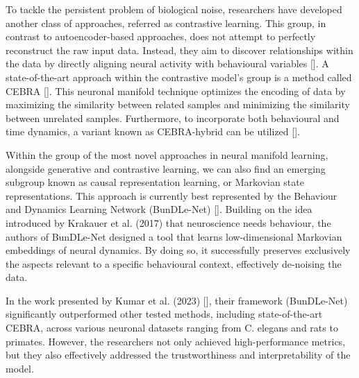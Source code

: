 \documentclass{article}
\begin{document}
To tackle the persistent problem of biological noise, researchers have developed another class of approaches, referred as contrastive learning. This group, in contrast to autoencoder-based approaches, does not attempt to perfectly reconstruct the raw input data. Instead, they aim to discover relationships within the data by directly aligning neural activity with behavioural variables [\cite{mathis2026joint}]. A state-of-the-art approach within the contrastive model’s group is a method called CEBRA [\cite{keshtkaran2022large}]. This neuronal manifold technique optimizes the encoding of data by maximizing the similarity between related samples and minimizing the similarity between unrelated samples. Furthermore, to incorporate both behavioural and time dynamics, a variant known as CEBRA-hybrid can be utilized [\cite{schneider2025time}].

Within the group of the most novel approaches in neural manifold learning, alongside generative and contrastive learning, we can also find an emerging subgroup known as causal representation learning, or Markovian state representations. This approach is currently best represented by the Behaviour and Dynamics Learning Network (BunDLe-Net) [\cite{kumar2023bunddle}]. Building on the idea introduced by Krakauer et al. (2017) \cite{krakauer2017neuroscience} that neuroscience needs behaviour, the authors of BunDLe-Net designed a tool that learns low-dimensional Markovian embeddings of neural dynamics. By doing so, it successfully preserves exclusively the aspects relevant to a specific behavioural context, effectively de-noising the data.

In the work presented by Kumar et al. (2023) [\cite{kumar2023bunddle}], their framework (BunDLe-Net) significantly outperformed other tested methods, including state-of-the-art CEBRA, across various neuronal datasets ranging from C. elegans and rats to primates. However, the researchers not only achieved high-performance metrics, but they also effectively addressed the trustworthiness and interpretability of the model. 
\end{document}
